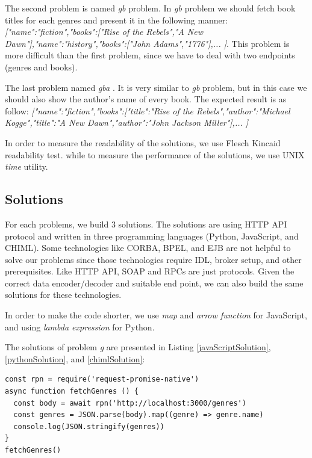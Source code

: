 \documentclass[conference]{IEEEtran}
\begin{document}
The second problem is named {\it gb } problem. In {\it gb } problem we should fetch book titles for each genres and present it in the following manner: {\it [{"name":"fiction","books":["Rise of the Rebels","A New Dawn"]},{"name":"history","books":["John Adams","1776"]},... ]}. This problem is more difficult than the first problem, since we have to deal with two endpoints (genres and books).

The last problem named {\it gba }. It is very similar to {\it gb } problem, but in this case we should also show the author's name of every book. The expected result is as follow: 
{\it [{"name":"fiction","books":[{"title":"Rise of the Rebels","author":"Michael Kogge"},{"title":"A New Dawn","author":"John Jackson Miller"}]},... ]}

In order to measure the readability of the solutions, we use Flesch Kincaid readability test. while to measure the performance of the solutions, we use UNIX {\it time} utility.

\subsection{Solutions}

For each problems, we build 3 solutions. The solutions are using HTTP API protocol and written in three programming languages (Python, JavaScript, and CHIML). Some technologies like CORBA, BPEL, and EJB are not helpful to solve our problems since those technologies require IDL, broker setup, and other prerequisites. Like HTTP API, SOAP and RPCs are just protocols. Given the correct data encoder/decoder and suitable end point, we can also build the same solutions for these technologies.

In order to make the code shorter, we use {\it map} and {\it arrow function} for JavaScript, and using {\it lambda expression} for Python.

The solutions of problem {\it g} are presented in Listing \ref{javaScriptSolution}, \ref{pythonSolution}, and \ref{chimlSolution}:

\begin{lstlisting}[caption=JavaScript Solution for problem-g, label=javaScriptSolution, basicstyle=\footnotesize, breaklines=true]
const rpn = require('request-promise-native')
async function fetchGenres () {
  const body = await rpn('http://localhost:3000/genres')
  const genres = JSON.parse(body).map((genre) => genre.name)
  console.log(JSON.stringify(genres))
}
fetchGenres()
\end{lstlisting}
\end{document}
